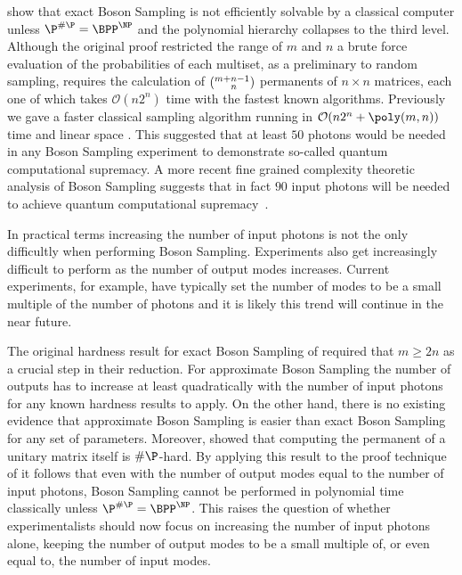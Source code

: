 \documentclass[a4paper,11pt]{article}
\newcommand{\bigo}[1]{\mathcal{O}(#1)}
\newcommand{\multichoose}[2]{(^{#1+#2-1}_{\hphantom{#1+}#2})}
\def\BS/{Boson Sampling}
\begin{document}
\citeauthor{aaronson2011computational} show that exact \BS/ is not efficiently solvable by a classical computer unless $\P^{\#\P}  = \BPP^{\NP}$ and the polynomial hierarchy collapses to the third level. Although the original proof restricted the range of $m$ and $n$ a  brute force evaluation of the probabilities of each multi\-set, as a preliminary to random sampling, requires the calculation of $\multichoose{m}{n}$  permanents of $n \times n$ matrices, each one of which takes $\bigo{n 2^n}$ time with the fastest known algorithms. Previously we gave a faster classical sampling algorithm running in  $\bigo{n 2^n + \poly(m,n)}$ time and linear space \citep{clifford2018classical}.    This suggested that at least $50$ photons would be needed in any Boson Sampling experiment to demonstrate so-called quantum computational supremacy.  A more recent fine grained complexity theoretic analysis of  \BS/ suggests that in fact $90$ input photons will be needed to achieve quantum computational supremacy~\citep{DHKLR:2020}.

In practical terms increasing the number of input photons is not the only difficultly when performing \BS/.  Experiments also get increasingly difficult to perform as the number of output modes increases. Current experiments, for example, have typically set the number of modes to be a small multiple of the number of photons and it is likely this trend will continue in the near future.

The original hardness result for exact \BS/ of \citeauthor{aaronson2011computational} required that $m \geq 2n$ as a crucial step in their reduction. For approximate \BS/ the number of outputs has to increase at least quadratically with the number of input photons for any known hardness results to apply. On the other hand, there is no existing evidence that approximate \BS/ is easier than exact \BS/ for any set of parameters.  Moreover, 
 \citet{GS:2018} showed that computing the permanent of a unitary matrix itself is $\#\P$-hard. By applying this result to the proof technique of  \citeauthor{aaronson2011computational} it follows that even with the number of output modes equal to the number of input photons, \BS/ cannot be performed in polynomial time classically unless $\P^{\#\P}  = \BPP^{\NP}$.  This raises the question of whether experimentalists should now focus on increasing the number of input photons alone, keeping the number of output modes to be a small multiple of, or even equal to, the number of input modes.
 
\end{document}
